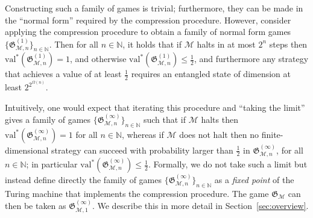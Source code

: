 \documentclass[11pt]{article}
\theoremstyle{definition}
\newcommand{\N}{\ensuremath{\mathbb{N}}}
\newcommand{\cM}{\ensuremath{\mathcal{M}}}
\newcommand{\val}{\ensuremath{\mathrm{val}}}
\newcommand{\game}{\mathfrak{G}}
\begin{document}
Constructing such a family of games is trivial; furthermore, they can be made in the  ``normal form'' required by the compression procedure. However, consider applying the compression procedure to obtain a family of normal form games $\{ \game_{\cM,n}^{(1)} \}_{n\in\N}$. Then for all $n \in \N$, it holds that if $\cM$ halts in at most $2^n$ steps then $\val^*(\game_{\cM,n}^{(1)})=1$, and otherwise $\val^*(\game_{\cM,n}^{(1)})\leq \frac{1}{2}$, and furthermore any strategy that achieves a value of at least $\frac{1}{2}$ requires an entangled state of dimension at least $2^{2^{\Omega(n)}}$.


Intuitively, one would expect that iterating this procedure and ``taking the limit'' gives a family of games $\{ \game_{\cM,n}^{(\infty)} \}_{n\in\N}$ such that if $\cM$ halts then $\val^*(\game_{\cM,n}^{(\infty)})=1$ for all $n \in \N$, whereas if $\cM$ does not halt then no finite-dimensional strategy can succeed with probability larger than $\frac{1}{2}$ in $\game_{\cM,n}^{(\infty)}$, for all $n \in \N$; in particular $\val^*(\game_{\cM,n}^{(\infty)})\leq \frac{1}{2}$. 
Formally, we do not take such a limit but instead define directly the family of games $\{ \game_{\cM,n}^{(\infty)} \}_{n\in\N}$ as a \emph{fixed point} of the Turing machine that implements the compression procedure. The game $\game_\cM$ can then be taken as $\game_{\cM,1}^{(\infty)}$. We describe this in more detail in Section~\ref{sec:overview}. 


	
	
	
	
\end{document}

